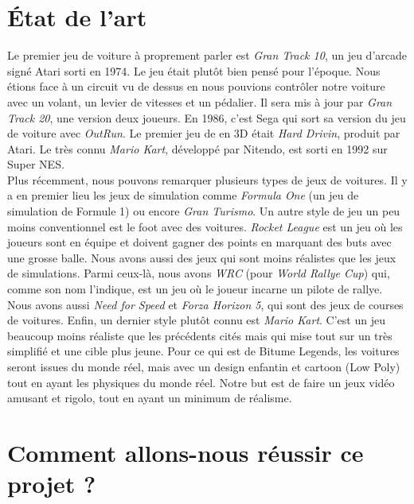 \documentclass[11pt,a4paper]{article}
\begin{document}
\section{État de l'art}
  Le premier jeu de voiture à proprement parler est \textit{Gran Track 10}, un jeu d'arcade signé Atari 
  sorti en 1974. Le jeu était plutôt bien pensé pour l'époque. Nous étions face à un 
  circuit vu de dessus en nous pouvions contrôler notre voiture avec un volant, un levier de vitesses
  et un pédalier. Il sera mis à jour par \textit{Gran Track 20}, une version deux joueurs.
  En 1986, c'est Sega qui sort sa version du jeu de voiture avec \textit{OutRun}. Le premier 
  jeu de en 3D était \textit{Hard Drivin}, produit par Atari. Le très connu \textit{Mario Kart},
  développé par Nitendo, est sorti en 1992 sur Super NES.\\
  \indent Plus récemment, nous pouvons remarquer plusieurs types de jeux de voitures. Il y a en premier lieu 
  les jeux de simulation comme \textit{Formula One} (un jeu de simulation de Formule 1) ou encore 
  \textit{Gran Turismo}. Un autre style de jeu un peu moins conventionnel est le foot avec des voitures. 
  \textit{Rocket League} est un jeu où les joueurs sont en équipe  et doivent gagner des
  points en marquant des buts avec une grosse balle. Nous avons aussi des jeux qui sont moins réalistes
  que les jeux de simulations. Parmi ceux-là, nous avons \textit{WRC} (pour \textit{World Rallye Cup})
  qui, comme son nom l'indique, est un jeu où le joueur incarne un pilote de rallye. Nous avons aussi 
  \textit{Need for Speed} et \textit{Forza Horizon 5}, qui sont des jeux de courses de voitures.
  Enfin, un dernier style plutôt connu est \textit{Mario Kart}. C'est un jeu beaucoup moins réaliste
  que les précédents cités mais qui mise tout sur un très simplifié et une cible plus jeune. 
  Pour ce qui est de Bitume Legends, les voitures seront issues du monde réel, mais avec un design
  enfantin et cartoon (Low Poly) tout en ayant les physiques du monde réel. Notre but est de faire 
  un jeux vidéo amusant et rigolo, tout en ayant un minimum de réalisme.\\
\clearpage

\section{Comment allons-nous réussir ce projet ?}
\end{document}

